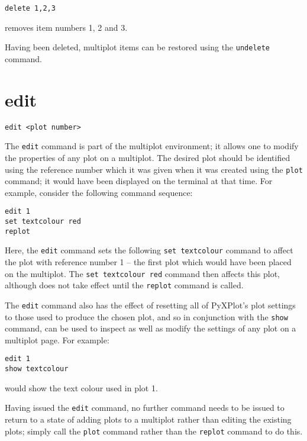 \begin{verbatim}
delete 1,2,3
\end{verbatim}

\noindent removes item numbers 1, 2 and 3.

Having been deleted, multiplot items can be restored using the {\tt undelete}
command.

\section{edit}

\begin{verbatim}
edit <plot number>
\end{verbatim}

The {\tt edit} command is part of the multiplot environment; it allows one to
modify the properties of any plot on a multiplot. The desired plot should be
identified using the reference number which it was given when it was created
using the {\tt plot} command; it would have been displayed on the terminal at
that time. For example, consider the following command sequence:

\begin{verbatim}
edit 1
set textcolour red
replot
\end{verbatim}

Here, the {\tt edit} command sets the following {\tt set textcolour} command to
affect the plot with reference number 1 -- the first plot which would have been
placed on the multiplot. The {\tt set textcolour red} command then affects this
plot, although does not take effect until the {\tt replot} command is called.

The {\tt edit} command also has the effect of resetting all of PyXPlot's plot
settings to those used to produce the chosen plot, and so in conjunction with
the {\tt show} command, can be used to inspect as well as modify the settings of
any plot on a multiplot page. For example:

\begin{verbatim}
edit 1
show textcolour
\end{verbatim}

\noindent would show the text colour used in plot 1.

Having issued the {\tt edit} command, no further command needs to be issued to
return to a state of adding plots to a multiplot rather than editing the
existing plots; simply call the {\tt plot} command rather than the {\tt replot}
command to do this.


